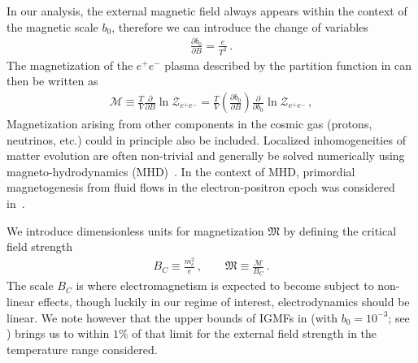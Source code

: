 In our analysis, the external magnetic field always appears within the context of the magnetic scale $b_{0}$, therefore we can introduce the change of variables
\begin{align}
 \frac{\partial b_{0}}{\partial{B}}=\frac{e}{T^{2}}\,.
\end{align}
The magnetization of the $e^{+}e^{-}$ plasma described by the partition function in  can then be written as
\begin{align}
 \label{defmagetization}
 \mathcal{M}\equiv\frac{T}{V}\frac{\partial}{\partial{B}}\ln{\mathcal{Z}_{e^{+}e^{-}}} = \frac{T}{V}\left(\frac{\partial b_{0}}{\partial{B}}\right)\frac{\partial}{\partial b_{0}}\ln{\mathcal{Z}_{e^{+}e^{-}}}\,,
\end{align}
Magnetization arising from other components in the cosmic gas (protons, neutrinos, etc.) could in principle also be included. Localized inhomogeneities of matter evolution are often non-trivial and generally be solved numerically using magneto-hydrodynamics (MHD)~\citep{melrose2008quantum,Vazza:2017qge,Vachaspati:2020blt}. In the context of MHD, primordial magnetogenesis from fluid flows in the electron-positron epoch was considered in~\cite{Gopal:2004ut,Perrone:2021srr}.

We introduce dimensionless units for magnetization ${\mathfrak M}$ by defining the critical field strength
\begin{align}
 {B}_{C}\equiv\frac{m_{e}^{2}}{e}\,,\qquad{\mathfrak M}\equiv\frac{\mathcal{M}}{{B}_{C}}\,.
\end{align}
The scale ${B}_{C}$ is where electromagnetism is expected to become subject to non-linear effects, though luckily in our regime of interest, electrodynamics should be linear. We note however that the upper bounds of IGMFs in  (with $b_{0}=10^{-3}$; see ) brings us to within $1\%$ of that limit for the external field strength in the temperature range considered.

